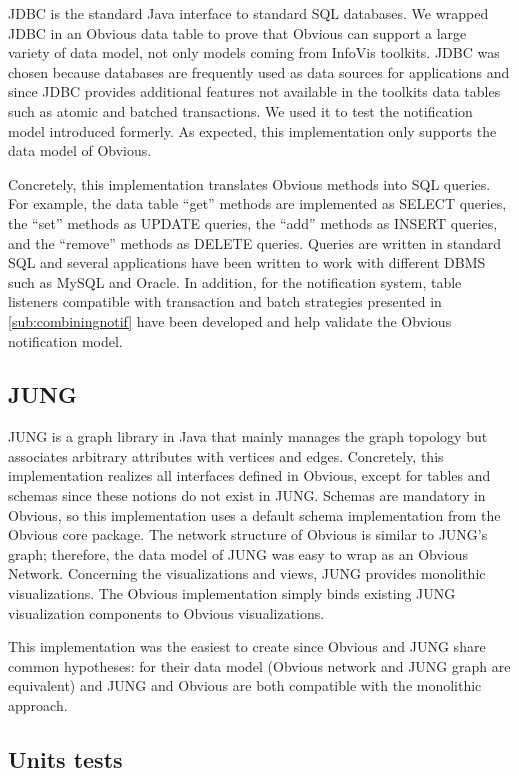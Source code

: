 JDBC is the standard Java interface to standard SQL databases.  We
wrapped JDBC in an Obvious data table to prove that Obvious can
support a large variety of data model, not only models coming from
InfoVis toolkits.  JDBC was chosen because databases
are frequently used as data sources for applications and since JDBC
provides additional features not available in the toolkits data tables
such as atomic and batched transactions.  We used it to test the
notification model introduced formerly.  As expected, this
implementation only supports the data model of Obvious.

Concretely, this implementation translates Obvious methods into SQL
queries.  For example, the data table ``get'' methods are implemented
as SELECT queries, the ``set'' methods as UPDATE queries, the ``add''
methods as INSERT queries, and the ``remove'' methods as DELETE
queries.  Queries are written in standard SQL and several applications
have been written to work with different DBMS such as MySQL and
Oracle.  In addition, for the notification system, table listeners
compatible with transaction and batch strategies presented in
\ref{sub:combiningnotif} have been developed and help validate the
Obvious notification model.

\subsection{JUNG}

JUNG is a graph library in Java that mainly manages the graph topology
but associates arbitrary attributes with vertices and edges.
Concretely, this implementation realizes all interfaces defined in
Obvious, except for tables and schemas since these notions do not
exist in JUNG.  Schemas are mandatory in Obvious, so this
implementation uses a default schema implementation from the Obvious
core package.  The network structure of Obvious is similar to JUNG's
graph; therefore, the data model of JUNG was easy to wrap as an
Obvious Network.  Concerning the visualizations and views, JUNG
provides monolithic visualizations.  The Obvious implementation simply
binds existing JUNG visualization components to Obvious visualizations.

This implementation was the easiest to create since Obvious and JUNG
share common hypotheses: for their data model (Obvious network and
JUNG graph are equivalent) and JUNG and Obvious are both compatible
with the monolithic approach.  

\subsection{Units tests}
\label{sub:unittests}

